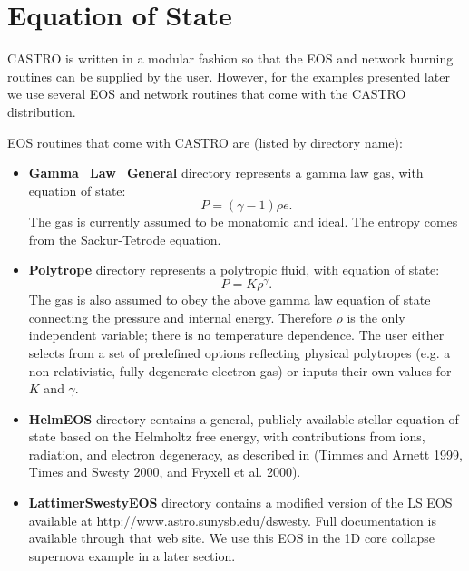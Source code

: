 \section{Equation of State}
CASTRO is written in a modular fashion so that the EOS and network
burning routines can be supplied by the user.   However, for the
examples presented later we use several EOS and network routines
that come with the CASTRO distribution.  

EOS routines that come with CASTRO are (listed by directory name):
\begin{itemize}
\item {\bf Gamma\_Law\_General} directory represents a gamma law gas, with equation of state:
\begin{equation}
  P = (\gamma - 1) \rho e.
\end{equation}
The gas is currently assumed to be monatomic and ideal. The entropy comes from the Sackur-Tetrode equation.
\item {\bf Polytrope} directory represents a polytropic fluid, with equation of state:
\begin{equation}
  P = K \rho^\gamma.
\end{equation}
The gas is also assumed to obey the above gamma law equation of state connecting the pressure and internal energy. Therefore $\rho$ is the only independent variable; there is no temperature dependence. The user either selects from a set of predefined options reflecting physical polytropes (e.g. a non-relativistic, fully degenerate electron gas) or inputs their own values for $K$ and $\gamma$.
\item {\bf HelmEOS} directory contains a general, publicly available
stellar equation of state based on the Helmholtz free energy,
with contributions from ions, radiation, and electron degeneracy, as
described in (Timmes and Arnett 1999, Times and Swesty 2000, and Fryxell et al. 2000).
\item {\bf LattimerSwestyEOS} directory contains a modified version of the
LS EOS available at http://www.astro.sunysb.edu/dswesty.  Full
documentation is available through that web site.  We use this EOS
in the 1D core collapse supernova example in a later section.
\end{itemize}


